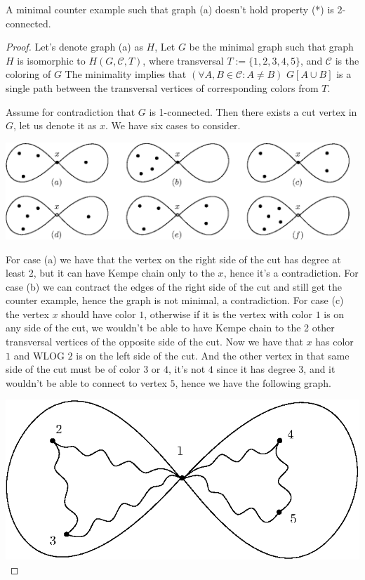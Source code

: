 \begin{lemma}
    A minimal counter example such that graph (a) doesn't hold property (*) is 2-connected.
\end{lemma}
\begin{proof}
    Let's denote graph (a) as $H$, Let $G$ be the minimal graph such that graph $H$ is isomorphic to $H(G, \mathcal{C}, T)$, where transversal $T := \{1, 2, 3, 4, 5\}$, and $\mathcal{C}$ is the coloring of $G$
    The minimality implies that $(\forall A,B \in \mathcal{C} : A \neq B)$ $G[A \cup B]$ is a single path between the transversal vertices of corresponding colors from $T$.

    Assume for contradiction that $G$ is 1-connected. Then there exists a cut vertex in $G$, let us denote it as $x$. We have six cases to consider.
    
    \vspace{0.3cm}
    \includegraphics[width=13cm]{img/hourglass+1-cases.eps}
    \vspace{0.3cm}


    For case (a) we have that the vertex on the right side of the cut has degree at least 2, but it can have Kempe chain only to the $x$, hence it's a contradiction.
    For case (b) we can contract the edges of the right side of the cut and still get the counter example, hence the graph is not minimal, a contradiction.
    For case (c) the vertex $x$ should have color $1$, otherwise if it is the vertex with color $1$ is on any side of the cut, we wouldn't be able to 
    have Kempe chain to the 2 other transversal vertices of the opposite side of the cut. Now we have that $x$ has color $1$ and WLOG $2$ is on the left side of the cut. 
    And the other vertex in that same side of the cut must be of color $3$ or $4$, it's not $4$ since it has degree 3, and it wouldn't be able to connect to vertex $5$, hence
we have the following graph.

\vspace{0.3cm}
\includegraphics[width=13.5cm]{img/hourglass+1-cases-2-conn(c).eps}
\vspace{0.1cm}



\end{proof}
